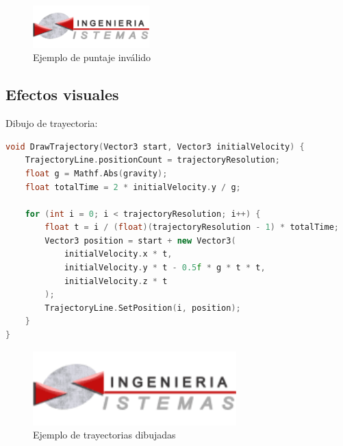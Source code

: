 \begin{figure}[h]
    \centering
    \includegraphics[width=0.4\textwidth]{img/epis.png}
    \caption{Ejemplo de puntaje inválido}
    \label{fig:invalido}
\end{figure}

\subsection{Efectos visuales}
Dibujo de trayectoria:
\begin{lstlisting}[language=C++]
void DrawTrajectory(Vector3 start, Vector3 initialVelocity) {
    TrajectoryLine.positionCount = trajectoryResolution;
    float g = Mathf.Abs(gravity);
    float totalTime = 2 * initialVelocity.y / g;
    
    for (int i = 0; i < trajectoryResolution; i++) {
        float t = i / (float)(trajectoryResolution - 1) * totalTime;
        Vector3 position = start + new Vector3(
            initialVelocity.x * t,
            initialVelocity.y * t - 0.5f * g * t * t,
            initialVelocity.z * t
        );
        TrajectoryLine.SetPosition(i, position);
    }
}
\end{lstlisting}

\begin{figure}[h]
    \centering
    \includegraphics[width=0.7\textwidth]{img/epis.png}
    \caption{Ejemplo de trayectorias dibujadas}
    \label{fig:trayectoria}
\end{figure}